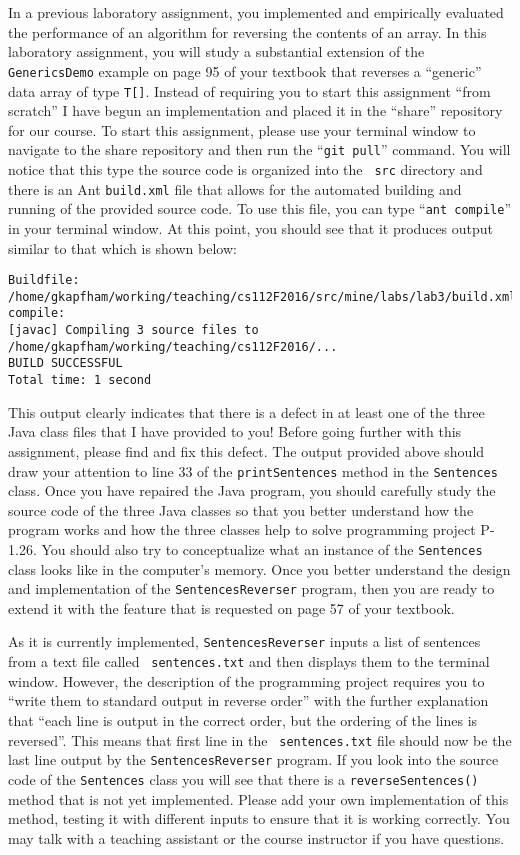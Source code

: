 In a previous laboratory assignment, you implemented and empirically evaluated the performance of an algorithm for
reversing the contents of an array. In this laboratory assignment, you will study a substantial extension of the {\tt
GenericsDemo} example on page 95 of your textbook that reverses a ``generic'' data array of type {\tt T[]}. Instead of
requiring you to start this assignment ``from scratch'' I have begun an implementation and placed it in the ``share''
repository for our course. To start this assignment, please use your terminal window to navigate to the share repository
and then run the ``{\tt git pull}'' command. You will notice that this type the source code is organized into the {\tt
src} directory and there is an Ant {\tt build.xml} file that allows for the automated building and running of the
provided source code. To use this file, you can type ``{\tt ant compile}'' in your terminal window. At this point, you
should see that it produces output similar to that which is shown below:

\begin{verbatim}
Buildfile: /home/gkapfham/working/teaching/cs112F2016/src/mine/labs/lab3/build.xml
compile:
[javac] Compiling 3 source files to /home/gkapfham/working/teaching/cs112F2016/...
BUILD SUCCESSFUL
Total time: 1 second
\end{verbatim}

This output clearly indicates that there is a defect in at least one of the three Java class files that I have provided
to you! Before going further with this assignment, please find and fix this defect. The output provided above should
draw your attention to line 33 of the {\tt printSentences} method in the {\tt Sentences} class. Once you have repaired
the Java program, you should carefully study the source code of the three Java classes so that you better understand how
the program works and how the three classes help to solve programming project P-1.26. You should also try to
conceptualize what an instance of the {\tt Sentences} class looks like in the computer's memory. Once you better
understand the design and implementation of the {\tt SentencesReverser} program, then you are ready to extend it with
the feature that is requested on page 57 of your textbook.

As it is currently implemented, {\tt SentencesReverser} inputs a list of sentences from a text file called {\tt
sentences.txt} and then displays them to the terminal window. However, the description of the programming project
requires you to ``write them to standard output in reverse order'' with the further explanation that ``each line is
output in the correct order, but the ordering of the lines is reversed''. This means that first line in the {\tt
sentences.txt} file should now be the last line output by the {\tt SentencesReverser} program. If you look into the
source code of the {\tt Sentences} class you will see that there is a {\tt reverseSentences()} method that is not yet
implemented. Please add your own implementation of this method, testing it with different inputs to ensure that it is
working correctly. You may talk with a teaching assistant or the course instructor if you have questions.

